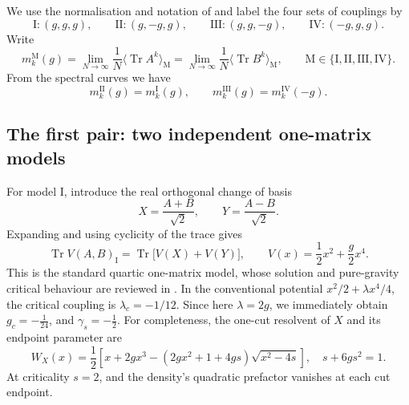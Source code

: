 We use the normalisation and notation of \cite{khalkhali2025bootstrappingcriticalbehaviormultimatrix} and label
the four sets of couplings by
\begin{equation}
    \mathrm I:(g,g,g),\qquad
    \mathrm{II}:(g,-g,g),\qquad
    \mathrm{III}:(g,g,-g),\qquad
    \mathrm{IV}:(-g,g,g).
    \label{eq:qtm-models}
\end{equation}
Write
\begin{equation}
    m_k^{\mathrm M}(g)
    =\lim_{N\to\infty}\frac1N
    \bigl\langle\operatorname{Tr}A^k\bigr\rangle_{\mathrm M}
    =\lim_{N\to\infty}\frac1N
    \bigl\langle\operatorname{Tr}B^k\bigr\rangle_{\mathrm M},
    \qquad \mathrm M\in\{\mathrm I,\mathrm{II},\mathrm{III},\mathrm{IV}\}.
    \label{eq:qtm-moment-definition}
\end{equation}
\noindent From the spectral curves we have
\begin{equation}
    m_k^{\mathrm{II}}(g)=m_k^{\mathrm I}(g),\qquad
    m_k^{\mathrm{III}}(g)=m_k^{\mathrm{IV}}(-g).
    \label{eq:qtm-pair-identities}
\end{equation}

\subsection{The first pair: two independent one-matrix models}

For model I, introduce the real orthogonal change of basis
\begin{equation}
    X=\frac{A+B}{\sqrt2},\qquad Y=\frac{A-B}{\sqrt2}.
\end{equation}
Expanding and using cyclicity of the trace gives
\begin{equation}
    \operatorname{Tr} V(A,B)_{\mathrm I}
    =\operatorname{Tr}\bigl[V(X)+V(Y)\bigr],
    \qquad V(x)=\frac12x^2+\frac g2x^4.
    \label{eq:qtm-factorization}
\end{equation}
This is the standard quartic one-matrix model, whose solution and pure-gravity critical behaviour
are reviewed in \cite{DiFrancesco:1993cyw}. In the conventional potential $x^2/2+\lambda x^4/4$,
the critical coupling is $\lambda_c=-1/12$. Since here $\lambda=2g$, we immediately obtain
$g_c=-\frac1{24}$, and $\gamma_s=-\frac12$. \noindent For completeness, the one-cut resolvent of
$X$ and its endpoint parameter are
\begin{equation}
    W_X(x)  =\frac12\left[x+2gx^3
        -(2gx^2+1+4gs)\sqrt{x^2-4s}\right], \quad s+6gs^2 =1.
    \label{eq:qtm-one-resolvent}
\end{equation}%
At criticality $s=2$, and the density's quadratic prefactor vanishes at each cut endpoint.

